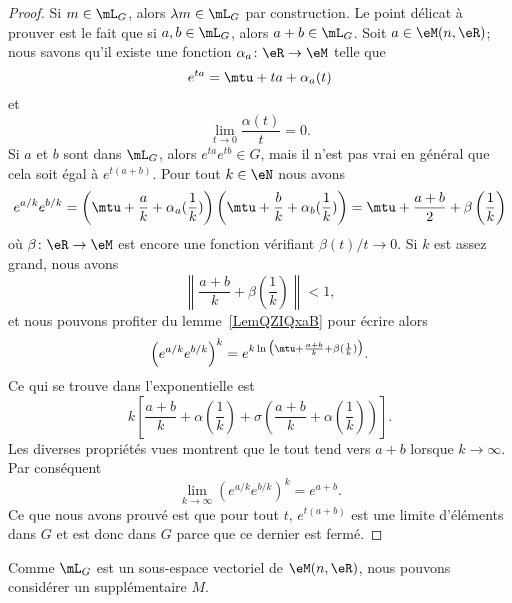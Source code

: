 \begin{proof}
	Si \( m\in\mL_G\), alors \( \lambda m\in\mL_G\) par construction. Le point délicat à prouver est le fait que si \( a,b\in \mL_G\), alors \( a+b\in\mL_G\). Soit \( a\in \eM(n,\eR)\); nous savons qu'il existe une fonction \( \alpha_a\colon \eR\to \eM\) telle que
	\begin{equation}
		e^{ta}=\mtu+ta+\alpha_a(t)
	\end{equation}
	et
	\begin{equation}
		\lim_{t\to 0} \frac{ \alpha(t) }{ t }=0.
	\end{equation}
	Si \( a\) et \( b\) sont dans \( \mL_G\), alors \(  e^{ta} e^{tb}\in G\), mais il n'est pas vrai en général que cela soit égal à \(  e^{t(a+b)}\). Pour tout \( k\in \eN\) nous avons
	\begin{equation}
		e^{a/k} e^{b/k}=\left( \mtu+\frac{ a }{ k }+\alpha_a(\frac{1}{ k }) \right)\left( \mtu+\frac{ b }{ k }+\alpha_b(\frac{1}{ k }) \right)=\mtu+\frac{ a+b }{2}+\beta\left( \frac{1}{ k } \right)
	\end{equation}
	où \( \beta\colon \eR\to \eM\) est encore une fonction vérifiant \( \beta(t)/t\to 0\). Si \( k\) est assez grand, nous avons
	\begin{equation}
		\left\| \frac{ a+b }{ k }+\beta(\frac{1}{ k })  \right\|<1,
	\end{equation}
	et nous pouvons profiter du lemme~\ref{LemQZIQxaB} pour écrire alors
	\begin{equation}
		\left(  e^{a/k} e^{b/k} \right)^k= e^{k\ln\big(\mtu+\frac{ a+b }{ k }+\beta(\frac{1}{ k })\big)}.
	\end{equation}
	Ce qui se trouve dans l'exponentielle est
	\begin{equation}
		k\left[ \frac{ a+b }{ k }+\alpha( \frac{1}{ k })+\sigma\left( \frac{ a+b }{ k }+\alpha(\frac{1}{ k }) \right) \right].
	\end{equation}
	Les diverses propriétés vues montrent que le tout tend vers \( a+b\) lorsque \( k\to \infty\). Par conséquent
	\begin{equation}
		\lim_{k\to \infty} \left(  e^{a/k} e^{b/k} \right)^k= e^{a+b}.
	\end{equation}
	Ce que nous avons prouvé est que pour tout \( t\), \(  e^{t(a+b)}\) est une limite d'éléments dans \( G\) et est donc dans \( G\) parce que ce dernier est fermé.
\end{proof}

Comme \( \mL_G\) est un sous-espace vectoriel de \( \eM(n,\eR)\), nous pouvons considérer un supplémentaire \( M\).

